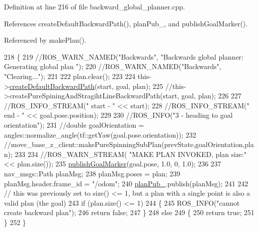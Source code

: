 Definition at line 216 of file backward\+\_\+global\+\_\+planner.\+cpp.



References create\+Default\+Backward\+Path(), plan\+Pub\+\_\+, and publish\+Goal\+Marker().



Referenced by make\+Plan().


\begin{DoxyCode}
218 \{
219     \textcolor{comment}{//ROS\_WARN\_NAMED("Backwards", "Backwards global planner: Generating global plan ");}
220     \textcolor{comment}{//ROS\_WARN\_NAMED("Backwards", "Clearing...");}
221 
222     plan.clear();
223 
224     this->\hyperlink{classmove__base__z__client_1_1backward__global__planner_1_1BackwardGlobalPlanner_a395d7f10f5e8dfb26fe9809912f29795}{createDefaultBackwardPath}(start, goal, plan);
225     \textcolor{comment}{//this->createPureSpiningAndStragihtLineBackwardPath(start, goal, plan);}
226 
227     \textcolor{comment}{//ROS\_INFO\_STREAM(" start - " << start);}
228     \textcolor{comment}{//ROS\_INFO\_STREAM(" end - " << goal.pose.position);}
229 
230     \textcolor{comment}{//ROS\_INFO("3 - heading to goal orientation");}
231     \textcolor{comment}{//double goalOrientation = angles::normalize\_angle(tf::getYaw(goal.pose.orientation));}
232     \textcolor{comment}{//move\_base\_z\_client::makePureSpinningSubPlan(prevState,goalOrientation,plan);}
233 
234     \textcolor{comment}{//ROS\_WARN\_STREAM( "MAKE PLAN INVOKED, plan size:"<< plan.size());}
235     \hyperlink{classmove__base__z__client_1_1backward__global__planner_1_1BackwardGlobalPlanner_adefb1127aa2a4f9c487763aea3817864}{publishGoalMarker}(goal.pose, 1.0, 0, 1.0);
236 
237     nav\_msgs::Path planMsg;
238     planMsg.poses = plan;
239     planMsg.header.frame\_id = \textcolor{stringliteral}{"/odom"};
240     \hyperlink{classmove__base__z__client_1_1backward__global__planner_1_1BackwardGlobalPlanner_ab074d9ac8ea790d7f5275ee27dae940c}{planPub\_}.publish(planMsg);
241 
242     \textcolor{comment}{// this was previously set to size() <= 1, but a plan with a single point is also a valid plan (the
       goal)}
243     \textcolor{keywordflow}{if} (plan.size() <= 1)
244     \{
245         ROS\_INFO(\textcolor{stringliteral}{"cannot create backward plan"});
246         \textcolor{keywordflow}{return} \textcolor{keyword}{false};
247     \}
248     \textcolor{keywordflow}{else}
249     \{
250         \textcolor{keywordflow}{return} \textcolor{keyword}{true};
251     \}
252 \}
\end{DoxyCode}



